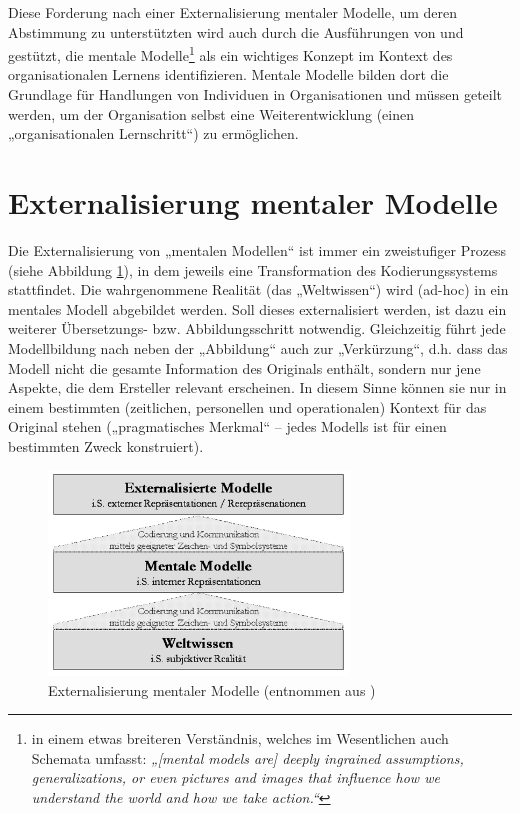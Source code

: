 Diese Forderung nach einer Externalisierung mentaler Modelle, um deren Abstimmung zu unterstützten wird auch durch die Ausführungen von \citet{Senge90} und \citep{Kim93} gestützt, die mentale Modelle\footnote{in einem etwas breiteren Verständnis, welches im Wesentlichen auch Schemata umfasst: \emph{„[mental models are] deeply ingrained assumptions, generalizations, or even pictures and images that influence how we understand the world and how we take action.“}\citet{Senge90}} als ein wichtiges Konzept im Kontext des organisationalen Lernens identifizieren. Mentale Modelle bilden dort die Grundlage für Handlungen von Individuen in Organisationen und müssen geteilt werden, um der Organisation selbst eine Weiterentwicklung (einen „organisationalen Lernschritt“) zu ermöglichen.

\section{Externalisierung mentaler Modelle} %
\label{sec:externalisierung_mentaler_modelle}

Die Externalisierung von „mentalen Modellen“ ist immer ein zweistufiger Prozess (siehe Abbildung \ref{fig:img_MentaleModelle_iffenthaler_externalisierung}), in dem jeweils eine Transformation des Kodierungssystems stattfindet. Die wahrgenommene Realität (das „Weltwissen“) wird (ad-hoc) in ein mentales Modell abgebildet werden. Soll dieses externalisiert werden, ist dazu ein weiterer Übersetzungs- bzw. Abbildungsschritt notwendig. Gleichzeitig führt jede Modellbildung nach \citet{Stachowiak73} neben der „Abbildung“ auch zur „Verkürzung“, d.h. dass das Modell nicht die gesamte Information des Originals enthält, sondern nur jene Aspekte, die dem Ersteller relevant erscheinen. In diesem Sinne können sie nur in einem bestimmten (zeitlichen, personellen und operationalen) Kontext für das Original stehen („pragmatisches Merkmal“ -- jedes Modells ist für einen bestimmten Zweck konstruiert).

\begin{figure}[htbp]
	\centering
		\includegraphics[width=8cm]{img/MentaleModelle/iffenthaler_externalisierung.png}
	\caption[Externalisierung mentaler Modelle]{Externalisierung mentaler Modelle (entnommen aus \citep{Ifenthaler06})}
	\label{fig:img_MentaleModelle_iffenthaler_externalisierung}
\end{figure}

